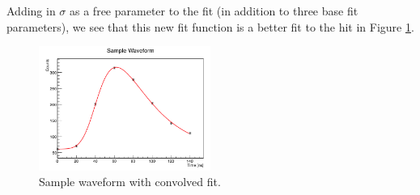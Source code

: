  Adding in $\sigma$ as a free parameter to the fit (in addition to three base  fit parameters), we see that this new fit function is a better fit to the hit in Figure \ref{sampleConvolvedFit}.
 \begin{figure}[htp!]
    \centering
    \includegraphics[width=0.5\textwidth]{Images/sampleConvolvedFit.png}
    \caption{Sample waveform with convolved fit.}
    \label{sampleConvolvedFit}
\end{figure} 


